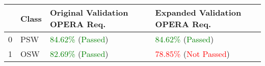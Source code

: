 \begin{tabular}{llll}
\toprule
 & Class & Original Validation OPERA Req. & Expanded Validation OPERA Req. \\
\midrule
0 & PSW & \textcolor{green}{84.62\%} (\textcolor{green}{Passed}) & \textcolor{green}{84.62\%} (\textcolor{green}{Passed}) \\
1 & OSW & \textcolor{green}{82.69\%} (\textcolor{green}{Passed}) & \textcolor{red}{78.85\%} (\textcolor{red}{Not Passed}) \\
\bottomrule
\end{tabular}
